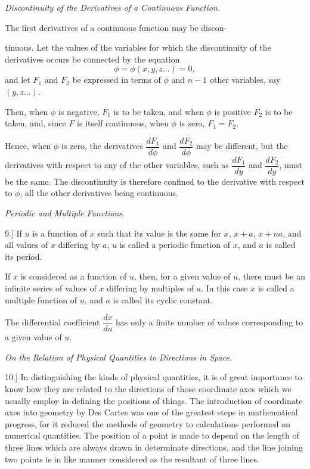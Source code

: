 \documentclass[11pt,a4paper]{article}
\begin{document}
\begin{center}
\textit{Discontinuity of the Derivatives of a Continuous Function.}
\end{center}

The first derivatives of a continuous function may be discon-

\clearpage

tinuous. Let the values of the variables for which the discontinuity of
the derivatives occurs be connected by the equation
\[
\phi=\phi(x,y,z\ldots)=0,
\]
and let \(F_1\) and \(F_2\) be expressed in terms of \(\phi\) and \(n-1\)
other variables, say \((y,z\ldots)\).

Then, when \(\phi\) is negative, \(F_1\) is to be taken, and when
\(\phi\) is positive \(F_2\) is to be taken, and, since \(F\) is itself
continuous, when \(\phi\) is zero, \(F_1=F_2\).

Hence, when \(\phi\) is zero, the derivatives \(\dfrac{dF_1}{d\phi}\)
and \(\dfrac{dF_2}{d\phi}\) may be different, but the derivatives with
respect to any of the other variables, such as \(\dfrac{dF_1}{dy}\) and
\(\dfrac{dF_2}{dy}\), must be the same. The discontinuity is therefore
confined to the derivative with respect to \(\phi\), all the other
derivatives being continuous.

\begin{center}
\textit{Periodic and Multiple Functions.}
\end{center}

9.] If \(u\) is a function of \(x\) such that its value is the same for
\(x\), \(x+a\), \(x+na\), and all values of \(x\) differing by \(a\),
\(u\) is called a periodic function of \(x\), and \(a\) is called its
period.

If \(x\) is considered as a function of \(u\), then, for a given value
of \(u\), there must be an infinite series of values of \(x\) differing
by multiples of \(a\). In this case \(x\) is called a multiple function
of \(u\), and \(a\) is called its cyclic constant.

The differential coefficient \(\dfrac{dx}{du}\) has only a finite
number of values corresponding to a given value of \(u\).

\begin{center}
\textit{On the Relation of Physical Quantities to Directions in Space.}
\end{center}

10.] In distinguishing the kinds of physical quantities, it is of great
importance to know how they are related to the directions of those
coordinate axes which we usually employ in defining the positions of
things. The introduction of coordinate axes into geometry by Des Cartes
was one of the greatest steps in mathematical progress, for it reduced
the methods of geometry to calculations performed on numerical
quantities. The position of a point is made to depend on the length of
three lines which are always drawn in determinate directions, and the
line joining two points is in like manner considered as the resultant of
three lines.
\end{document}
